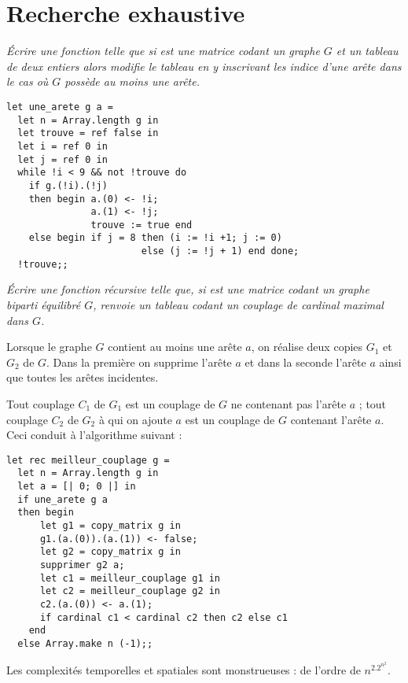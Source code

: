 \section{Recherche exhaustive}
\begin{Exercise}\it
Écrire une fonction  telle que si  est une matrice codant un graphe $G$ et  un tableau de deux entiers alors  modifie le tableau  en y inscrivant les indice d'une arête dans le cas où $G$ possède au moins une arête.
\end{Exercise}
\begin{Answer}
\begin{lstlisting}
let une_arete g a =
  let n = Array.length g in
  let trouve = ref false in
  let i = ref 0 in
  let j = ref 0 in
  while !i < 9 && not !trouve do
    if g.(!i).(!j)
    then begin a.(0) <- !i; 
               a.(1) <- !j; 
               trouve := true end
    else begin if j = 8 then (i := !i +1; j := 0)
                        else (j := !j + 1) end done;
  !trouve;;
\end{lstlisting}
\end{Answer}
\begin{Exercise}\it
Écrire une fonction récursive  telle que, si  est une matrice codant un graphe biparti équilibré $G$,  renvoie un tableau codant un couplage de cardinal maximal dans $G$.
\end{Exercise}
\begin{Answer}
Lorsque le graphe $G$ contient au moins une arête $a$, on réalise deux copies $G_1$ et $G_2$ de $G$. Dans la première on supprime l'arête $a$ et dans la seconde l'arête $a$ ainsi que toutes les arêtes incidentes.

Tout couplage $C_1$ de $G_1$ est un couplage de $G$ ne contenant pas l'arête $a$ ; tout couplage $C_2$ de $G_2$ à qui on ajoute $a$ est un couplage de $G$ contenant l'arête $a$. Ceci conduit à l'algorithme suivant :
\begin{lstlisting}
let rec meilleur_couplage g =
  let n = Array.length g in
  let a = [| 0; 0 |] in
  if une_arete g a 
  then begin
      let g1 = copy_matrix g in
      g1.(a.(0)).(a.(1)) <- false;
      let g2 = copy_matrix g in
      supprimer g2 a;
      let c1 = meilleur_couplage g1 in
      let c2 = meilleur_couplage g2 in
      c2.(a.(0)) <- a.(1);
      if cardinal c1 < cardinal c2 then c2 else c1
    end
  else Array.make n (-1);;
\end{lstlisting}

Les complexités temporelles et spatiales sont monstrueuses : de l'ordre de $n^2.2^{n^2}$.

\end{Answer}
